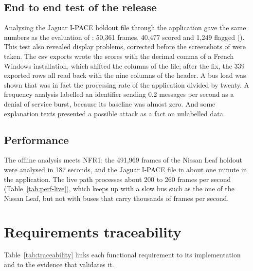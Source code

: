 \subsection{End to end test of the release}
\label{sec:e2e}

Analysing the Jaguar I-PACE holdout file through the application gave the same numbers as the evaluation of : 50{,}361 frames, 40{,}477 scored and 1{,}249 flagged (). This test also revealed display problems, corrected before the screenshots of  were taken. The \gls{csv} exports wrote the scores with the decimal comma of a French Windows installation, which shifted the columns of the file; after the fix, the 339 exported rows all read back with the nine columns of the header. A bus load was shown that was in fact the processing rate of the application divided by twenty. A frequency analysis labelled an identifier sending 0.2 messages per second as a denial of service burst, because its baseline was almost zero. And some explanation texts presented a possible attack as a fact on unlabelled data.

\subsection{Performance}

The offline analysis meets NFR1: the 491{,}969 frames of the Nissan Leaf holdout were analysed in 187 seconds, and the Jaguar I-PACE file in about one minute in the application. The live path processes about 200 to 260 frames per second (Table~\ref{tab:perf-live}), which keeps up with a slow bus such as the one of the Nissan Leaf, but not with buses that carry thousands of frames per second.

\Needspace{399pt}%
\section{Requirements traceability}
\label{sec:traceability}

Table~\ref{tab:traceability} links each functional requirement to its implementation and to the evidence that validates it.

